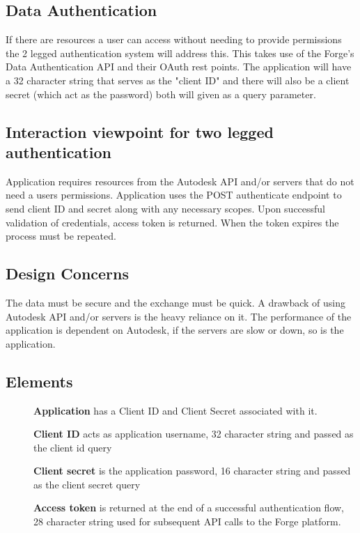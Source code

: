 \documentclass[letterpaper, 10pt, draftclsnofoot, compsoc, onecolumn]{IEEEtran}
\begin{document}
\newpage
\subsection{Data Authentication}
\label{Two legged} 
	If there are resources a user can access without needing to provide permissions the 2 legged authentication system will address this. This takes use of the Forge's Data Authentication API and their OAuth rest points. The application will have a 32 character string that serves as the "client ID" and there will also be a client secret (which act as the password) both will given as a query parameter. 
\subsection{Interaction viewpoint for two legged authentication}
	Application requires resources from the Autodesk API and/or servers that do not need a users permissions. Application uses the POST authenticate endpoint to send client ID and secret along with any necessary scopes. Upon successful validation of credentials, access token is returned. When the token expires the process must be repeated.
\subsection{Design Concerns}
	The data must be secure and the exchange must be quick. A drawback of using Autodesk API and/or servers is the heavy reliance on it. The performance of the application is dependent on Autodesk, if the servers are slow or down, so is the application.
\subsection{Elements}
\begin{description}
	\item[]\textbf{Application} has a Client ID and Client Secret associated with it.
	\item[]\textbf{Client ID} acts as application username, 32 character string and passed as the client id query
	\item[]\textbf{Client secret} is the application password, 16 character string and passed as the client secret query
	\item[]\textbf{Access token} is returned at the end of a successful authentication flow, 28 character string used for subsequent API calls to the Forge platform. 
\end{description}
\end{document}
